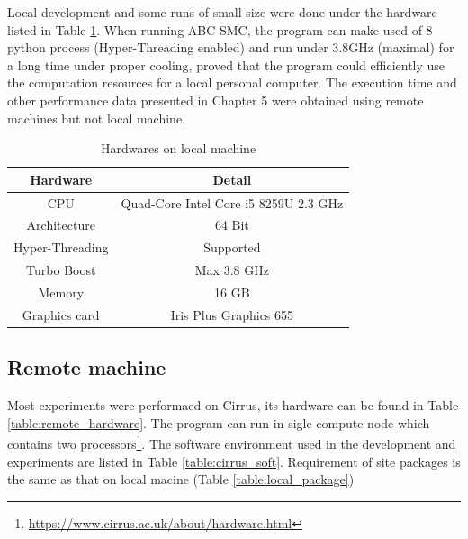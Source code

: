 Local development and some runs of small size were done under the hardware listed in Table \ref{table:local_hardware}. When running ABC SMC, the program can make used of 8 python process (Hyper-Threading enabled) and run under 3.8GHz (maximal) for a long time under proper cooling, proved that the program could efficiently use the computation resources for a local personal computer. The execution time and other performance data presented in Chapter 5 were obtained using remote machines but not local machine.

\begin{table}
    \centering
    \begin{tabular}{|c c|}
        \hline
        Hardware        & Detail                                \\ [0.5ex]
        \hline\hline
        CPU             & Quad-Core Intel Core i5 8259U 2.3 GHz \\
        Architecture    & 64 Bit                                \\
        Hyper-Threading & Supported                             \\
        Turbo Boost     & Max 3.8 GHz                           \\
        Memory          & 16 GB                                 \\
        Graphics card   & Iris Plus Graphics 655                \\
        \hline
    \end{tabular}
    \caption{Hardwares on local machine}
    \label{table:local_hardware}
\end{table}



\subsection{Remote machine}

Most experiments were performaed on Cirrus, its hardware can be found in Table \ref{table:remote_hardware}. The program can run in sigle compute-node which contains two processors\footnote{\url{https://www.cirrus.ac.uk/about/hardware.html}}. The software environment used in the development and experiments are listed in Table \ref{table:cirrus_soft}. Requirement of site packages is the same as that on local macine (Table \ref{table:local_package})

